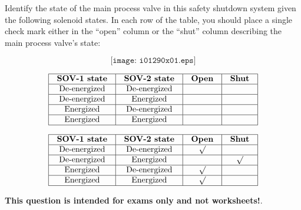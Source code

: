 

Identify the state of the main process valve in this safety shutdown system given the following solenoid states.  In each row of the table, you should place a single check mark either in the ``open'' column or the ``shut'' column describing the main process valve's state:

$$\texttt{[image: i01290x01.eps]}$$


$$\vbox{\offinterlineskip
\halign{\strut
\vrule \quad\hfil # \ \hfil & 
\vrule \quad\hfil # \ \hfil & 
\vrule \quad\hfil # \ \hfil & 
\vrule \quad\hfil # \ \hfil \vrule \cr
\noalign{\hrule}
%
{\bf SOV-1 state} & {\bf SOV-2 state} & {\bf Open} & {\bf Shut} \cr
%
\noalign{\hrule}
%
De-energized & De-energized &  &  \cr
%
\noalign{\hrule}
%
De-energized & Energized &  &  \cr
%
\noalign{\hrule}
%
Energized & De-energized &  &  \cr
%
\noalign{\hrule}
%
Energized & Energized &  &  \cr
%
\noalign{\hrule}
} %
}$$ %








$$\vbox{\offinterlineskip
\halign{\strut
\vrule \quad\hfil # \ \hfil & 
\vrule \quad\hfil # \ \hfil & 
\vrule \quad\hfil # \ \hfil & 
\vrule \quad\hfil # \ \hfil \vrule \cr
\noalign{\hrule}
%
{\bf SOV-1 state} & {\bf SOV-2 state} & {\bf Open} & {\bf Shut} \cr
%
\noalign{\hrule}
%
De-energized & De-energized & $\surd$ &  \cr
%
\noalign{\hrule}
%
De-energized & Energized &  & $\surd$ \cr
%
\noalign{\hrule}
%
Energized & De-energized & $\surd$ &  \cr
%
\noalign{\hrule}
%
Energized & Energized & $\surd$ &  \cr
%
\noalign{\hrule}
} %
}$$ %







{\bf This question is intended for exams only and not worksheets!}.


